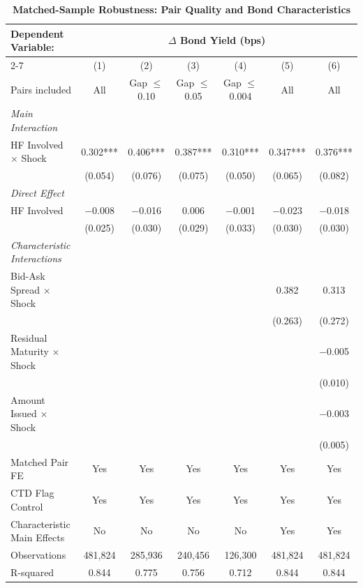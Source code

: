 \documentclass[english, 11pt, oneside]{article}
\begin{document}
\begin{table}[h!]
\centering
\caption{\textbf{Matched-Sample Robustness: Pair Quality and Bond Characteristics}}
\footnotesize
\setlength{\tabcolsep}{5pt}
\renewcommand{\arraystretch}{1.1}
\begin{tabular}{l c c c c c c}
\toprule
\textbf{Dependent Variable:} & \multicolumn{6}{c}{\textbf{$\Delta$ Bond Yield (bps)}} \\
\cmidrule(lr){2-7}
 & (1) & (2) & (3) & (4) & (5) & (6) \\
Pairs included & All & Gap $\leq$ 0.10 & Gap $\leq$ 0.05 & Gap $\leq$ 0.004 & All & All \\
\midrule
\textit{Main Interaction} & & & & & & \\
HF Involved $\times$ Shock & 0.302*** & 0.406*** & 0.387*** & 0.310*** & 0.347*** & 0.376*** \\
 & (0.054) & (0.076) & (0.075) & (0.050) & (0.065) & (0.082) \\
\addlinespace
\textit{Direct Effect} & & & & & & \\
HF Involved & $-$0.008 & $-$0.016 & 0.006 & $-$0.001 & $-$0.023 & $-$0.018 \\
 & (0.025) & (0.030) & (0.029) & (0.033) & (0.030) & (0.030) \\
\addlinespace
\textit{Characteristic Interactions} & & & & & & \\
Bid-Ask Spread $\times$ Shock & & & & & 0.382 & 0.313 \\
 & & & & & (0.263) & (0.272) \\
Residual Maturity $\times$ Shock & & & & & & $-$0.005 \\
 & & & & & & (0.010) \\
Amount Issued $\times$ Shock & & & & & & $-$0.003 \\
 & & & & & & (0.005) \\
\midrule
Matched Pair FE & Yes & Yes & Yes & Yes & Yes & Yes \\
CTD Flag Control & Yes & Yes & Yes & Yes & Yes & Yes \\
Characteristic Main Effects & No & No & No & No & Yes & Yes \\
\midrule
Observations & 481,824 & 285,936 & 240,456 & 126,300 & 481,824 & 481,824 \\
R-squared & 0.844 & 0.775 & 0.756 & 0.712 & 0.844 & 0.844 \\
\bottomrule
\end{tabular}
\label{tab:pair_quality}

\end{table}
\end{document}
